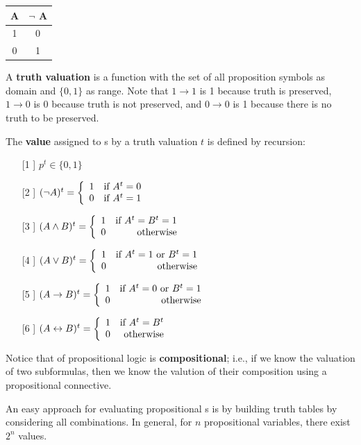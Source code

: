 \documentclass[english, 11pt]{article}
\begin{document}
  \begin{center}
    \begin{tabular}{c | c}
      A & $\neg$ A \\
      \hline
      1 & 0 \\
      0 & 1 \\
    \end{tabular}
  \end{center}

  A \textbf{truth valuation} is a function with the set of all proposition symbols as domain and $\{0,1\}$ as range. Note that $1 \rightarrow 1$ is 1 because truth is preserved, $1 \rightarrow 0$ is 0 because truth is not preserved, and $0 \rightarrow 0$ is 1 because there is no truth to be preserved.

  \begin{defn}[value]\label{value}
    The \textbf{value} assigned to s by a truth valuation $t$ is defined by recursion:
    \begin{itemize}
      \item[[1]] $p^t \in \{0,1\}$
      \item[[2]] $(\neg A)^t = \left\{ \begin{array}{lr} 1 & \mbox{if $A^t = 0$} \\ 0 & \mbox{if $A^t = 1$} \end{array} \right.$
      \item[[3]]  $(A \land B)^t = \left\{ \begin{array}{lr} 1 & \mbox{if $A^t = B^t = 1$} \\ 0 & \mbox{otherwise} \end{array} \right.$
      \item[[4]]  $(A \lor B)^t = \left\{ \begin{array}{lr} 1 & \mbox{if $A^t = 1$ or $B^t = 1$} \\ 0 & \mbox{otherwise} \end{array} \right.$
      \item[[5]]  $(A \rightarrow B)^t = \left\{ \begin{array}{lr} 1 & \mbox{if $A^t = 0$ or $B^t = 1$} \\ 0 & \mbox{otherwise} \end{array} \right.$
      \item[[6]]  $(A \leftrightarrow B)^t = \left\{ \begin{array}{lr} 1 & \mbox{if $A^t = B^t$} \\ 0 & \mbox{otherwise} \end{array} \right.$
    \end{itemize}
  \end{defn}

  \begin{defn}[compositional]
  \label{compositional}
    Notice that  of propositional logic is \textbf{compositional}; i.e., if we know the valuation of two subformulas, then we know the valution of their composition using a propositional connective.
  \end{defn}

  An easy approach for evaluating propositional s is by building truth tables by considering all combinations. In general, for $n$ propositional variables, there exist $2^n$ values. \\
\end{document}
